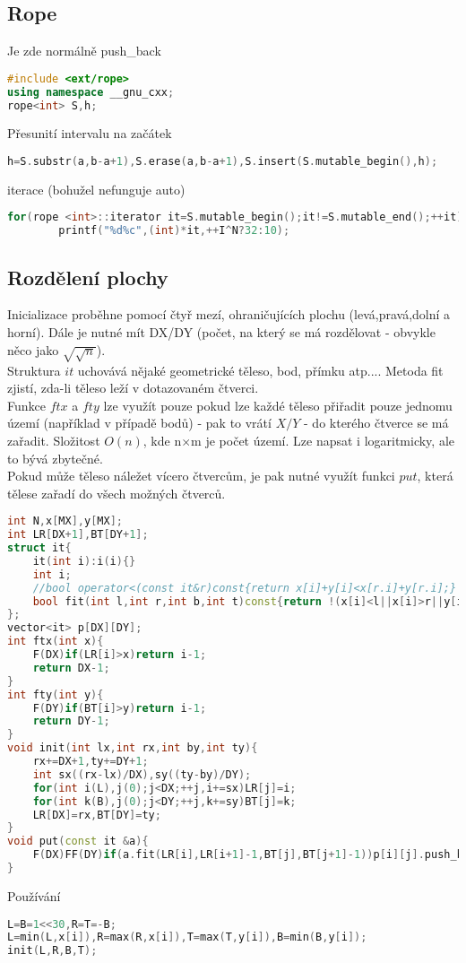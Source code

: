\documentclass[11pt]{article}
\begin{document}
\subsection{Rope}
Je zde normálně push\_back
\begin{lstlisting}[language=C++]
#include <ext/rope>
using namespace __gnu_cxx;
rope<int> S,h;
\end{lstlisting}
Přesunití intervalu na začátek
\begin{lstlisting}[language=C++]
h=S.substr(a,b-a+1),S.erase(a,b-a+1),S.insert(S.mutable_begin(),h);
\end{lstlisting}
iterace (bohužel nefunguje auto)
\begin{lstlisting}[language=C++]
for(rope <int>::iterator it=S.mutable_begin();it!=S.mutable_end();++it)
        printf("%d%c",(int)*it,++I^N?32:10);
\end{lstlisting}
\subsection{Rozdělení plochy}
Inicializace proběhne pomocí čtyř mezí, ohraničujících plochu (levá,pravá,dolní a horní). Dále je nutné mít DX/DY (počet, na který se má rozdělovat - obvykle něco jako $\sqrt{\sqrt{n}}$).
\\Struktura $it$ uchovává nějaké geometrické těleso, bod, přímku atp.... Metoda fit zjistí, zda-li těleso leží v dotazovaném čtverci.
\\Funkce $ftx$ a $fty$ lze využít pouze pokud lze každé těleso přiřadit pouze jednomu území (například v případě bodů) - pak to vrátí $X/Y$ - do kterého čtverce se má zařadit. Složitost $O(n)$, kde \textsf{n}$\times$\textsf{m} je počet území. Lze napsat i logaritmicky, ale to bývá zbytečné.
\\Pokud může těleso náležet vícero čtvercům, je pak nutné využít funkci $put$, která tělese zařadí do všech možných čtverců.
\begin{lstlisting}[language=C++]
int N,x[MX],y[MX];
int LR[DX+1],BT[DY+1];
struct it{
    it(int i):i(i){}
    int i;
    //bool operator<(const it&r)const{return x[i]+y[i]<x[r.i]+y[r.i];}
    bool fit(int l,int r,int b,int t)const{return !(x[i]<l||x[i]>r||y[i]<b||y[i]>t);}
};
vector<it> p[DX][DY];
int ftx(int x){
    F(DX)if(LR[i]>x)return i-1;
    return DX-1;
}
int fty(int y){
    F(DY)if(BT[i]>y)return i-1;
    return DY-1;
}
void init(int lx,int rx,int by,int ty){
    rx+=DX+1,ty+=DY+1;
    int sx((rx-lx)/DX),sy((ty-by)/DY);
    for(int i(L),j(0);j<DX;++j,i+=sx)LR[j]=i;
    for(int k(B),j(0);j<DY;++j,k+=sy)BT[j]=k;
    LR[DX]=rx,BT[DY]=ty;
}
void put(const it &a){
    F(DX)FF(DY)if(a.fit(LR[i],LR[i+1]-1,BT[j],BT[j+1]-1))p[i][j].push_back(a);
}
\end{lstlisting}
\begin{center}
Používání
\end{center}
\begin{lstlisting}[language=C++]
L=B=1<<30,R=T=-B;
L=min(L,x[i]),R=max(R,x[i]),T=max(T,y[i]),B=min(B,y[i]);
init(L,R,B,T);
\end{lstlisting}
\end{document}
